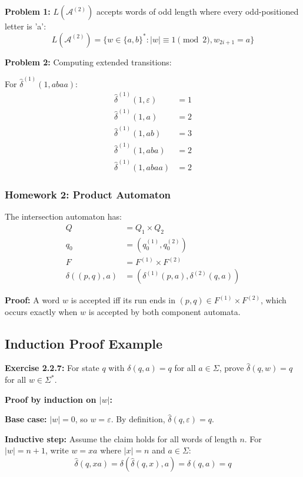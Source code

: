 \documentclass{article}
\begin{document}
\textbf{Problem 1:} $L(\mathcal{A}^{(2)})$ accepts words of odd length where every odd-positioned letter is 'a':
$$L(\mathcal{A}^{(2)}) = \{w \in \{a,b\}^* : |w| \equiv 1 \pmod{2}, w_{2i+1} = a\}$$

\textbf{Problem 2:} Computing extended transitions:

For $\hat{\delta}^{(1)}(1, abaa)$:
\begin{align*}
\hat{\delta}^{(1)}(1, \varepsilon) &= 1 \\
\hat{\delta}^{(1)}(1, a) &= 2 \\
\hat{\delta}^{(1)}(1, ab) &= 3 \\
\hat{\delta}^{(1)}(1, aba) &= 2 \\
\hat{\delta}^{(1)}(1, abaa) &= 2
\end{align*}

\subsubsection{Homework 2: Product Automaton}

The intersection automaton has:
\begin{align*}
Q &= Q_1 \times Q_2 \\
q_0 &= (q_0^{(1)}, q_0^{(2)}) \\
F &= F^{(1)} \times F^{(2)} \\
\delta((p,q), a) &= (\delta^{(1)}(p,a), \delta^{(2)}(q,a))
\end{align*}

\textbf{Proof:} A word $w$ is accepted iff its run ends in $(p,q) \in F^{(1)} \times F^{(2)}$, which occurs exactly when $w$ is accepted by both component automata.

\subsection{Induction Proof Example}

\textbf{Exercise 2.2.7:} For state $q$ with $\delta(q,a) = q$ for all $a \in \Sigma$, prove $\hat{\delta}(q,w) = q$ for all $w \in \Sigma^*$.

\textbf{Proof by induction on $|w|$:}

\textbf{Base case:} $|w| = 0$, so $w = \varepsilon$. By definition, $\hat{\delta}(q,\varepsilon) = q$.

\textbf{Inductive step:} Assume the claim holds for all words of length $n$. For $|w| = n+1$, write $w = xa$ where $|x| = n$ and $a \in \Sigma$:
$$\hat{\delta}(q,xa) = \delta(\hat{\delta}(q,x), a) = \delta(q,a) = q$$
\end{document}

